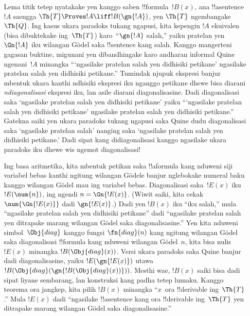 \documentclass[../../../include/open-logic-section]{subfiles}
\begin{document}


\begin{explain}
Lema titik tetep nyatakake yen kanggo saben !!{formula}~$!B(x)$, ana
!!a{sentence}~$!A$ saengga $\Th{T} \Proves !A \liff !B(\gn{!A})$,
yen $\Th{T}$ ngembangake~$\Th{Q}$. Ing kasus ukara paradoks tukang
ngapusi, kita kepengin $!A$ ekuivalen (bisa dibuktekake ing~$\Th{T}$)
karo~``$\gn{!A}$ salah,'' yaiku pratelan yen $\Gn{!A}$ iku
wilangan G\"odel saka !!{sentence} kang salah. Kanggo mangerteni
gagasan buktine, migunani yen dibandhingake karo andharan informal
Quine ngenani~$!A$ minangka
``{}`ngasilake pratelan salah yen didhisiki petikane' ngasilake
pratelan salah yen didhisiki petikane.'' Tumindak njupuk ekspresi
banjur mbentuk ukara kanthi ndhisiki ekspresi iku nganggo petikane
dhewe bisa diarani \emph{ndiagonalisasi} ekspresi iku, lan asile
diarani diagonalisasine. Dadi diagonalisasi saka
`ngasilake pratelan salah yen didhisiki petikane' yaiku
``{}`ngasilake pratelan salah yen didhisiki petikane' ngasilake
pratelan salah yen didhisiki petikane.'' Gatekna saiki yen ukara
paradoks tukang ngapusi saka Quine dudu diagonalisasi saka
`ngasilake pratelan salah' nanging saka
`ngasilake pratelan salah yen didhisiki petikane.' Dadi sipat kang
didiagonalisasi kanggo ngasilake ukara paradoks iku dhewe wis
ngemot diagonalisasi!{}

Ing basa aritmetika, kita mbentuk petikan saka !!a{formula} kang
nduweni siji variabel bebas kanthi ngitung wilangan G\"odele banjur
nglebokake numeral baku kanggo wilangan G\"odel mau ing variabel
bebas. Diagonalisasi saka~$!E(x)$ iku $!E(\num{n})$, ing ngendi
$n = \Gn{!E(x)}$. (Wiwit saiki, kita cekak $\num{\Gn{!E(x)}}$ dadi
$\gn{!E(x)}$.) Dadi yen $!B(x)$ iku ``iku salah,'' mula ``ngasilake
pratelan salah yen didhisiki petikane'' dadi ``ngasilake pratelan
salah yen ditrapake marang wilangan G\"odel saka diagonalisasine.''
Yen kita nduweni simbol~$\Obj{diag}$ kanggo fungsi $\fn{diag}(n)$ kang
ngitung wilangan G\"odel saka diagonalisasi !!{formula} kang nduweni
wilangan G\"odel~$n$, kita bisa nulis $!E(x)$ minangka
$!B(\Obj{diag}(x))$. Versi ukara paradoks saka Quine banjur dadi
diagonalisasine, yaiku $!E(\gn{!E(x)})$ utawa
$!B(\Obj{diag}(\gn{!B(\Obj{diag}(x))}))$. Mesthi wae, $!B(x)$ saiki
bisa dadi sipat liyane sembarang, lan konstruksi kang padha tetep
lumaku. Kanggo teorema ora jangkep, kita pilih $!B(x)$ minangka
``$x$~ora !!{derivable} ing~$\Th{T}$.'' Mula $!E(x)$ dadi
``ngasilake !!a{sentence} kang ora !!{derivable} ing~$\Th{T}$
yen ditrapake marang wilangan G\"odel saka diagonalisasine.''


\end{explain}
\end{document}
